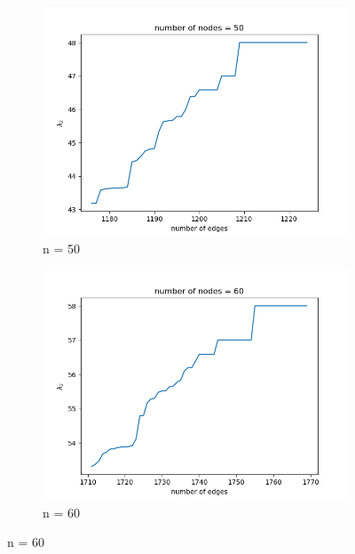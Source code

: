 \documentclass{article}
\begin{document}
\begin{problem}
\begin{figure}[!ht]
\begin{subfigure}{0.35\textwidth}
        \includegraphics[width=\textwidth]{./img/p5_node50.png}
        \caption{n = 50}
    \end{subfigure}
    \begin{subfigure}{0.35\textwidth}
        \includegraphics[width=\textwidth]{./img/p5_node60.png}
        \caption{n = 60 }
    \end{subfigure}
\end{figure}
\newpage
\begin{figure}[!h]
    \centering
    

\end{figure}
\end{problem}
\end{document}
